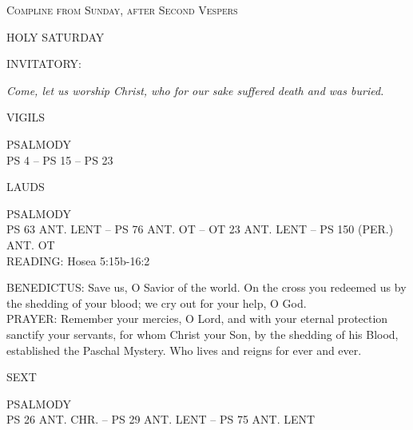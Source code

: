 \begin{center}\small\textsc{Compline from Sunday, after Second Vespers}\end{center}

\begin{center}
\normalsize HOLY SATURDAY
\end{center}

\noindent\small{\uppercase{INVITATORY:}}\normalsize
\begin{center}
\textit{Come, let us worship Christ, who for our sake suffered death and was buried.\\}
\end{center}
\begin{flushleft}\normalsize{\uppercase{VIGILS\\}}\end{flushleft}
\noindent\small{\uppercase{PSALMODY}\\}
\uppercase{Ps 4 -- Ps 15 -- Ps 23}\vspace{0.5em}\\

\begin{flushleft}\normalsize{\uppercase{LAUDS\\}}\end{flushleft}
\noindent\small{\uppercase{PSALMODY}\\}
\uppercase{Ps 63 ant. Lent -- Ps 76 ant. OT -- OT 23 ant. Lent -- Ps 150 (Per.) ant. OT}\vspace{0.5em}\\

\noindent\small{\uppercase{READING:}}    Hosea 5:15b-16:2 \textbf{   \\}

\noindent\small{\uppercase{BENEDICTUS:}}	Save us, O Savior of the world. On the cross you redeemed us by the shedding of your blood; we cry out for your help, O God.\\

\noindent\small{\uppercase{PRAYER:}}	Remember your mercies, O Lord, and with your eternal protection sanctify your servants, for whom Christ your Son, by the shedding of his Blood, established the Paschal Mystery. Who lives and reigns for ever and ever.

\begin{flushleft}\normalsize{\uppercase{SEXT\\}}\end{flushleft}
\noindent\small{\uppercase{PSALMODY}\\}
\uppercase{Ps 26 ant. Chr. -- Ps 29 ant. Lent -- Ps 75 ant. Lent}\vspace{0.5em}\\

